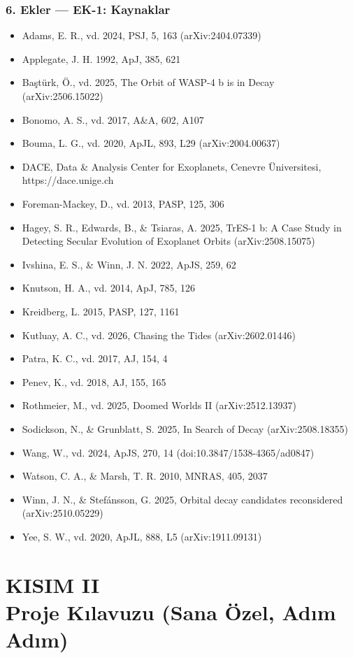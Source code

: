 \section*{6. Ekler — EK-1: Kaynaklar}
\begin{small}
\begin{itemize}[leftmargin=*,itemsep=0.05em,label={}]
\item Adams, E. R., vd. 2024, PSJ, 5, 163 (arXiv:2404.07339)
\item Applegate, J. H. 1992, ApJ, 385, 621
\item Baştürk, Ö., vd. 2025, The Orbit of WASP-4 b is in Decay (arXiv:2506.15022)
\item Bonomo, A. S., vd. 2017, A\&A, 602, A107
\item Bouma, L. G., vd. 2020, ApJL, 893, L29 (arXiv:2004.00637)
\item DACE, Data \& Analysis Center for Exoplanets, Cenevre Üniversitesi, https://dace.unige.ch
\item Foreman-Mackey, D., vd. 2013, PASP, 125, 306
\item Hagey, S. R., Edwards, B., \& Tsiaras, A. 2025, TrES-1 b: A Case Study in Detecting Secular Evolution of Exoplanet Orbits (arXiv:2508.15075)
\item Ivshina, E. S., \& Winn, J. N. 2022, ApJS, 259, 62
\item Knutson, H. A., vd. 2014, ApJ, 785, 126
\item Kreidberg, L. 2015, PASP, 127, 1161
\item Kutluay, A. C., vd. 2026, Chasing the Tides (arXiv:2602.01446)
\item Patra, K. C., vd. 2017, AJ, 154, 4
\item Penev, K., vd. 2018, AJ, 155, 165
\item Rothmeier, M., vd. 2025, Doomed Worlds II (arXiv:2512.13937)
\item Sodickson, N., \& Grunblatt, S. 2025, In Search of Decay (arXiv:2508.18355)
\item Wang, W., vd. 2024, ApJS, 270, 14 (doi:10.3847/1538-4365/ad0847)
\item Watson, C. A., \& Marsh, T. R. 2010, MNRAS, 405, 2037
\item Winn, J. N., \& Stefánsson, G. 2025, Orbital decay candidates reconsidered (arXiv:2510.05229)
\item Yee, S. W., vd. 2020, ApJL, 888, L5 (arXiv:1911.09131)
\end{itemize}
\end{small}

\clearpage
\part*{KISIM II\\[0.3em] Proje Kılavuzu (Sana Özel, Adım Adım)}

